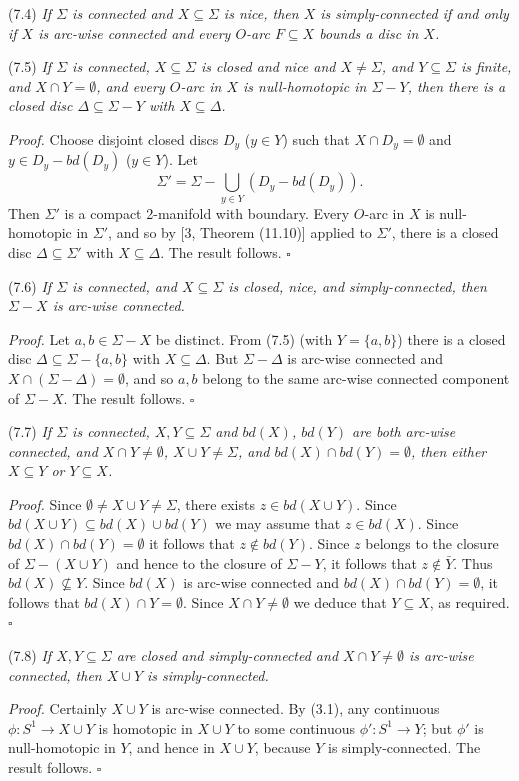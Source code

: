\stmt
(7.4) \textit{If $\Sigma$ is connected and $X \subseteq \Sigma$ is nice, then $X$ is simply-connected if and only if $X$ is arc-wise connected and every $O$-arc $F \subseteq X$ bounds a disc in $X$.}

\stmt
(7.5) \textit{If $\Sigma$ is connected, $X \subseteq \Sigma$ is closed and nice and $X \ne \Sigma$, and $Y \subseteq \Sigma$ is finite, and $X \cap Y = \emptyset$, and every $O$-arc in $X$ is null-homotopic in $\Sigma - Y$, then there is a closed disc $\Delta \subseteq \Sigma - Y$ with $X \subseteq \Delta$.}

\textit{Proof.} Choose disjoint closed discs $D_y$ ($y \in Y$) such that $X \cap D_y = \emptyset$ and $y \in D_y - bd(D_y)$ ($y \in Y$). Let
\begin{equation*}
\Sigma' = \Sigma - \bigcup_{y \in Y} (D_y - bd(D_y)).
\end{equation*}
Then $\Sigma'$ is a compact 2-manifold with boundary. Every $O$-arc in $X$ is null-homotopic in $\Sigma'$, and so by [3, Theorem (11.10)] applied to $\Sigma'$, there is a closed disc $\Delta \subseteq \Sigma'$ with $X \subseteq \Delta$. The result follows. $\square$

\stmt
(7.6) \textit{If $\Sigma$ is connected, and $X \subseteq \Sigma$ is closed, nice, and simply-connected, then $\Sigma - X$ is arc-wise connected.}

\textit{Proof.} Let $a, b \in \Sigma - X$ be distinct. From (7.5) (with $Y = \{a, b\}$) there is a closed disc $\Delta \subseteq \Sigma - \{a, b\}$ with $X \subseteq \Delta$. But $\Sigma - \Delta$ is arc-wise connected and $X \cap (\Sigma - \Delta) = \emptyset$, and so $a, b$ belong to the same arc-wise connected component of $\Sigma - X$. The result follows. $\square$

\stmt
(7.7) \textit{If $\Sigma$ is connected, $X, Y \subseteq \Sigma$ and $bd(X)$, $bd(Y)$ are both arc-wise connected, and $X \cap Y \ne \emptyset$, $X \cup Y \ne \Sigma$, and $bd(X) \cap bd(Y) = \emptyset$, then either $X \subseteq Y$ or $Y \subseteq X$.}

\textit{Proof.} Since $\emptyset \ne X \cup Y \ne \Sigma$, there exists $z \in bd(X \cup Y)$. Since $bd(X \cup Y) \subseteq bd(X) \cup bd(Y)$ we may assume that $z \in bd(X)$. Since $bd(X) \cap bd(Y) = \emptyset$ it follows that $z \notin bd(Y)$. Since $z$ belongs to the closure of $\Sigma - (X \cup Y)$ and hence to the closure of $\Sigma - Y$, it follows that $z \notin \bar{Y}$. Thus $bd(X) \nsubseteq Y$. Since $bd(X)$ is arc-wise connected and $bd(X) \cap bd(Y) = \emptyset$, it follows that $bd(X) \cap Y = \emptyset$. Since $X \cap Y \ne \emptyset$ we deduce that $Y \subseteq X$, as required. $\square$

\stmt
(7.8) \textit{If $X, Y \subseteq \Sigma$ are closed and simply-connected and $X \cap Y \ne \emptyset$ is arc-wise connected, then $X \cup Y$ is simply-connected.}

\textit{Proof.} Certainly $X \cup Y$ is arc-wise connected. By (3.1), any continuous $\phi \colon S^1 \to X \cup Y$ is homotopic in $X \cup Y$ to some continuous $\phi' \colon S^1 \to Y$; but $\phi'$ is null-homotopic in $Y$, and hence in $X \cup Y$, because $Y$ is simply-connected. The result follows. $\square$
